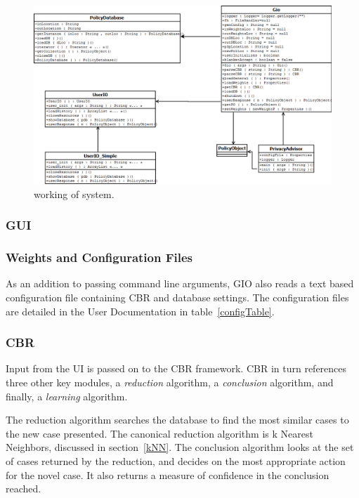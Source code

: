 \begin{figure}[htbp]
\begin{center}
\includegraphics[width = \textwidth]{DesignReport/uml/gio.png}
\caption{working of system.}
\label{working of system}
\end{center}
\end{figure}

\subsubsection{GUI}

\subsubsection{Weights and Configuration Files}
As an addition to passing command line arguments, GIO also reads a text based configuration file containing CBR and database settings. The configuration files are detailed in the User Documentation in table~\ref{configTable}. 

\subsubsection{CBR}
Input from the UI is passed on to the CBR framework. CBR in turn references three other key modules, a \emph{reduction} algorithm, a \emph{conclusion} algorithm, and finally, a \emph{learning} algorithm.

The reduction algorithm searches the database to find the most similar cases to the new case presented. The canonical reduction algorithm is k Nearest Neighbors, discussed in section~\ref{kNN}. The conclusion algorithm looks at the set of cases returned by the reduction, and decides on the most appropriate action for the novel case. It also returns a measure of confidence in the conclusion reached.

